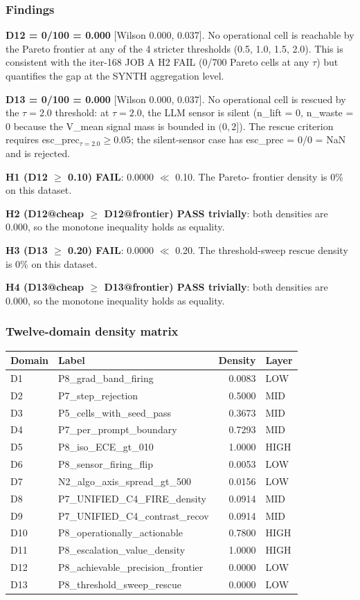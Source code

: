 \subsubsection{Findings}
\textbf{D12 = 0/100 = 0.000} [Wilson 0.000, 0.037]. No operational
cell is reachable by the Pareto frontier at any of the 4 stricter
thresholds (0.5, 1.0, 1.5, 2.0). This is consistent with the
iter-168 JOB A H2 FAIL (0/700 Pareto cells at any $\tau$) but
quantifies the gap at the SYNTH aggregation level.

\textbf{D13 = 0/100 = 0.000} [Wilson 0.000, 0.037]. No operational
cell is rescued by the $\tau=2.0$ threshold: at $\tau=2.0$, the LLM
sensor is silent (n\_lift = 0, n\_waste = 0 because the V\_mean
signal mass is bounded in $(0, 2]$). The rescue criterion requires
esc\_prec$_{\tau=2.0} \geq 0.05$; the silent-sensor case has
esc\_prec = 0/0 = NaN and is rejected.

\textbf{H1 (D12 $\geq$ 0.10) FAIL}: 0.0000 $\ll$ 0.10. The Pareto-
frontier density is 0\% on this dataset.

\textbf{H2 (D12@cheap $\geq$ D12@frontier) PASS trivially}: both
densities are 0.000, so the monotone inequality holds as equality.

\textbf{H3 (D13 $\geq$ 0.20) FAIL}: 0.0000 $\ll$ 0.20. The
threshold-sweep rescue density is 0\% on this dataset.

\textbf{H4 (D13@cheap $\geq$ D13@frontier) PASS trivially}: both
densities are 0.000, so the monotone inequality holds as equality.

\subsubsection{Twelve-domain density matrix}
\begin{tabular}{llrl}
\hline
Domain & Label & Density & Layer \\
\hline
D1 & P8\_grad\_band\_firing & 0.0083 & LOW \\
D2 & P7\_step\_rejection & 0.5000 & MID \\
D3 & P5\_cells\_with\_seed\_pass & 0.3673 & MID \\
D4 & P7\_per\_prompt\_boundary & 0.7293 & MID \\
D5 & P8\_iso\_ECE\_gt\_010 & 1.0000 & HIGH \\
D6 & P8\_sensor\_firing\_flip & 0.0053 & LOW \\
D7 & N2\_algo\_axis\_spread\_gt\_500 & 0.0156 & LOW \\
D8 & P7\_UNIFIED\_C4\_FIRE\_density & 0.0914 & MID \\
D9 & P7\_UNIFIED\_C4\_contrast\_recov & 0.0914 & MID \\
D10 & P8\_operationally\_actionable & 0.7800 & HIGH \\
D11 & P8\_escalation\_value\_density & 1.0000 & HIGH \\
D12 & P8\_achievable\_precision\_frontier & 0.0000 & LOW \\
D13 & P8\_threshold\_sweep\_rescue & 0.0000 & LOW \\
\hline
\end{tabular}

